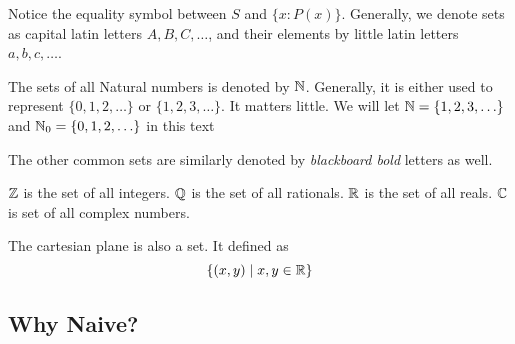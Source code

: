 \begin{remark}
    Notice the equality symbol between \(S\) and \( \{x : P(x)\} \). Generally, we denote sets
    as capital latin letters \(A, B, C, \ldots\), and their elements by little latin
    letters \(a, b, c, \ldots\).
\end{remark}

\begin{example}
    The sets of all Natural numbers is denoted by \(\mathbb N\). Generally, it is either used to 
    represent \( \{0, 1, 2, \ldots\} \) or \( \{1, 2, 3, \ldots\} \). It matters little.
    We will let \(\mathbb N = \{1, 2, 3, \ldots\}\) and \(\mathbb N_0 = \{0, 1, 2, \ldots\}\) in this text 
\end{example}

\begin{example}
    The other common sets are similarly denoted by \emph{blackboard bold} letters as well.
    \begin{enumerate}
        \ii \(\mathbb Z\) is the set of all integers.
        \ii \(\mathbb Q\) is the set of all rationals.
        \ii \(\mathbb R\) is the set of all reals.
        \ii \(\mathbb C\) is set of all complex numbers.
    \end{enumerate}
\end{example}


\begin{example}
    The cartesian plane is also a set. It defined as \[\{(x,y) \mid x, y \in \mathbb R\}\]
\end{example}

\subsection{Why Naive?}




